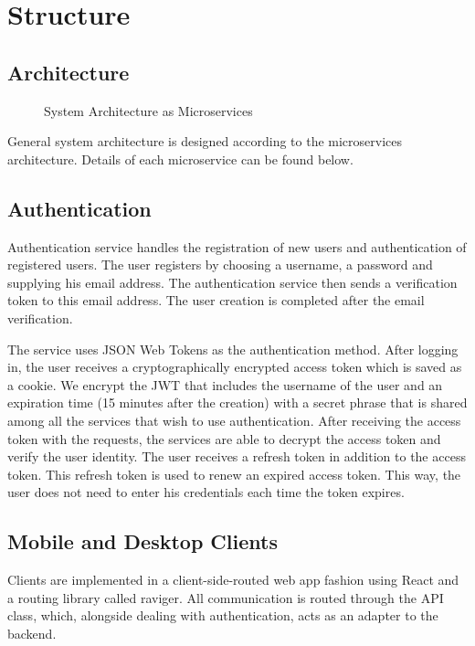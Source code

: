 \section{Structure}

\subsection{Architecture}
\begin{figure}[hb]
    \centering
    \caption{System Architecture as Microservices}
    \label{fig:microservices}
\end{figure}

General system architecture is designed according to the microservices architecture. Details of each microservice can be found below.

\subsection{Authentication}
Authentication service handles the registration of new users and authentication of registered users. The user registers by choosing a username, a password and supplying his email address. The authentication service then sends a verification token to this email address. The user creation is completed after the email verification.
\par The service uses JSON Web Tokens as the authentication method. After logging in, the user receives a cryptographically encrypted access token which is saved as a cookie. We encrypt the JWT that includes the username of the user and an expiration time (15 minutes after the creation) with a secret phrase that is shared among all the services that wish to use authentication. After receiving the access token with the requests, the services are able to decrypt the access token and verify the user identity. The user receives a refresh token in addition to the access token. This refresh token is used to renew an expired access token. This way, the user does not need to enter his credentials each time the token expires.

\subsection{Mobile and Desktop Clients}
Clients are implemented in a client-side-routed web app fashion using React and a routing library called raviger. All communication is routed through the API class, which, alongside dealing with authentication, acts as an adapter to the backend.
